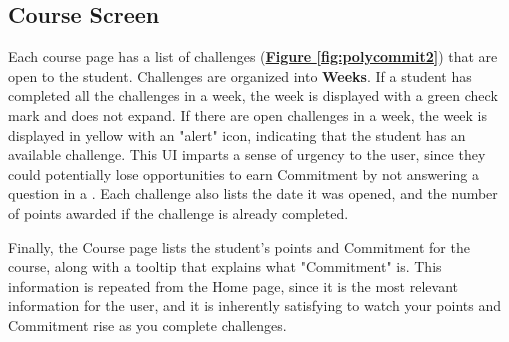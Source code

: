 \subsection{Course Screen}
\par Each course page has a list of challenges (\textbf{\hyperref[fig:polycommit2]{Figure \ref*{fig:polycommit2}}}) that are open to the student. Challenges are organized into \textbf{Weeks}. If a student has completed all the challenges in a week, the week is displayed with a green check mark and does not expand. If there are open challenges in a week, the week is displayed in yellow with an "alert" icon, indicating that the student has an available challenge. This UI imparts a sense of urgency to the user, since they could potentially lose opportunities to earn Commitment by not answering a question in a . Each challenge also lists the date it was opened, and the number of points awarded if the challenge is already completed.

\par Finally, the Course page lists the student's points and Commitment for the course, along with a tooltip that explains what "Commitment" is. This information is repeated from the Home page, since it is the most relevant information for the user, and it is inherently satisfying to watch your points and Commitment rise as you complete challenges.

